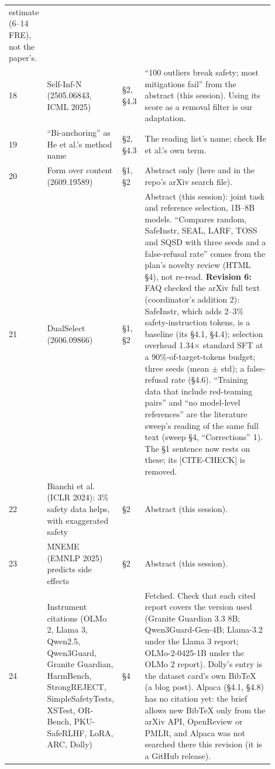 \documentclass{article}
\theoremstyle{plain}
\theoremstyle{definition}
\theoremstyle{remark}
\begin{document}
\begin{longtable}{@{}L{0.03\linewidth}L{0.24\linewidth}L{0.08\linewidth}L{0.55\linewidth}@{}}
      estimate (6--14 FRE), not the paper's. \\
  18 & Self-Inf-N (2505.06843, ICML 2025) & \S{}2, \S{}4.3 & ``100 outliers
      break safety; most mitigations fail'' from the abstract (this session).
      Using its score as a removal filter is our adaptation. \\
  19 & ``Bi-anchoring'' as He et al.'s method name & \S{}2, \S{}4.3 & The
      reading list's name; check He et al.'s own term. \\
  20 & Form over content (2609.19589) & \S{}1, \S{}2 & Abstract only (here and
      in the repo's arXiv search file). \\
  21 & DualSelect (2606.09866) & \S{}1, \S{}2 & Abstract (this session): joint
      task and reference selection, 1B--8B models. ``Compares random, SafeInstr,
      SEAL, LARF, TOSS and SQSD with three seeds and a false-refusal rate''
      comes from the plan's novelty review (HTML \S{}4), not re-read.
      \textbf{Revision 6:} FAQ checked the arXiv full text (coordinator's
      addition 2): SafeInstr, which adds 2--3\% safety-instruction tokens, is a
      baseline (its \S{}4.1, \S{}4.4); selection overhead 1.34$\times$ standard
      SFT at a 90\%-of-target-tokens budget; three seeds (mean $\pm$ std); a
      false-refusal rate (\S{}4.6). ``Training data that include red-teaming
      pairs'' and ``no model-level references'' are the literature sweep's
      reading of the same full text (sweep \S{}4, ``Corrections'' 1). The \S{}1
      sentence now rests on these; its [CITE-CHECK] is removed. \\
  22 & Bianchi et al. (ICLR 2024): 3\% safety data helps, with exaggerated
      safety & \S{}2 & Abstract (this session). \\
  23 & MNEME (EMNLP 2025) predicts side effects & \S{}2 & Abstract (this
      session). \\
  24 & Instrument citations (OLMo 2, Llama 3, Qwen2.5, Qwen3Guard, Granite
      Guardian, HarmBench, StrongREJECT, SimpleSafetyTests, XSTest, OR-Bench,
      PKU-SafeRLHF, LoRA, ARC, Dolly) & \S{}4 & Fetched. Check that each cited
      report covers the version used (Granite Guardian 3.3 8B;
      Qwen3Guard-Gen-4B; Llama-3.2 under the Llama 3 report; OLMo-2-0425-1B
      under the OLMo 2 report). Dolly's entry is the dataset card's own BibTeX
      (a blog post). Alpaca (\S{}4.1, \S{}4.8) has no citation yet: the brief
      allows new BibTeX only from the arXiv API, OpenReview or PMLR, and Alpaca
      was not searched there this revision (it is a GitHub release). \\

\end{longtable}
\end{document}
